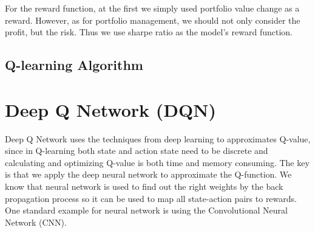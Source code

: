 For the reward function, at the first we simply used portfolio value change as a reward. However, as for portfolio management, we should not only consider the profit, but the risk. Thus we use sharpe ratio as the model’s reward function.

\subsection{Q-learning Algorithm}
\def\skipl{0.2in}
\vspace{\skipl}
\vspace{\skipl}

\section{Deep Q Network (DQN)}
Deep Q Network uses the techniques from deep learning to approximates Q-value, since in Q-learning both state and action state need to be discrete and calculating and optimizing Q-value is both time and memory consuming. The key is that we apply the deep neural network to approximate the Q-function. We know that neural network is used to find out the right weights by the back propagation process so it can be used to map all state-action pairs to rewards. One standard example for neural network is using the Convolutional Neural Network (CNN). 

